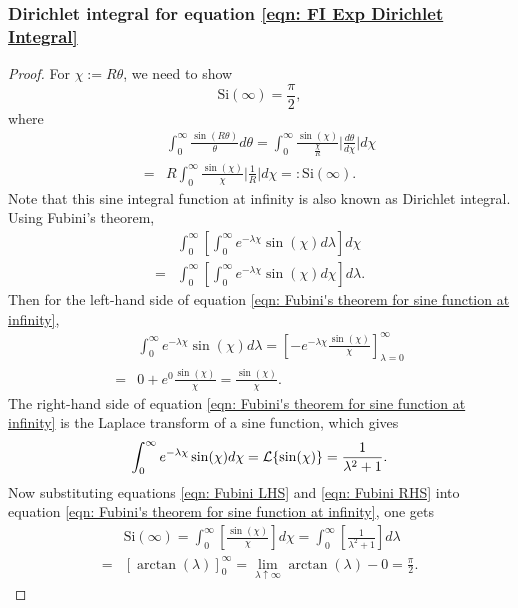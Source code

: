 \documentclass[%
 reprint,
 amsmath,amssymb,
 aps,
]{revtex4-2}
\begin{document}
\subsubsection{Dirichlet integral for equation \eqref{eqn: FI Exp Dirichlet Integral}}
\begin{proof}
    For $\chi := R\theta$, we need to show
    \begin{equation*}
        \text{Si}(\infty) = \frac{\pi}{2},
    \end{equation*}
    where
    \begin{align*}
        & \int_0^\infty \frac{\sin(R\theta)}{\theta} d\theta
        = \int_0^\infty \frac{\sin(\chi)}{\frac{\chi}{R}} \bigg|\frac{d\theta}{d\chi}\bigg| d\chi \\
        = & R \int_0^\infty \frac{\sin(\chi)}{\chi} \bigg|\frac{1}{R}\bigg| d\chi
        =: \text{Si}(\infty).
    \end{align*}
    Note that this sine integral function at infinity is also known as Dirichlet integral.
    Using Fubini's theorem,
    \begin{align} \label{eqn: Fubini's theorem for sine function at infinity}
        & \int_0^\infty\left[\int_0^\infty e^{-\lambda\chi}\sin(\chi)d\lambda\right]d\chi \\
        = & \int_0^\infty\left[\int_0^\infty e^{-\lambda\chi}\sin(\chi)d\chi\right]d\lambda.
    \end{align}
    Then for the left-hand side of equation \eqref{eqn: Fubini's theorem for sine function at infinity},
    \begin{align} \label{eqn: Fubini LHS}
        & \int_0^\infty e^{-\lambda\chi}\sin(\chi)d\lambda = \left[-e^{-\lambda\chi}\frac{\sin(\chi)}{\chi} \right]_{\lambda = 0}^\infty \\
        = & 0 + e^0\frac{\sin(\chi)}{\chi} = \frac{\sin(\chi)}{\chi}.
    \end{align}
    The right-hand side of equation \eqref{eqn: Fubini's theorem for sine function at infinity} is the Laplace transform of a sine function, which gives
    \begin{equation} \label{eqn: Fubini RHS}
        \int_0^\infty e^{-\lambda\chi}\sin(\chi)d\chi \\
        = \mathcal{L}\{\sin(\chi)\} = \frac{1}{\lambda^2 + 1}.
    \end{equation}
    Now substituting equations \eqref{eqn: Fubini LHS} and \eqref{eqn: Fubini RHS} into equation \eqref{eqn: Fubini's theorem for sine function at infinity}, one gets
    \begin{align*}
        & \text{Si}(\infty) = \int_0^\infty\left[\frac{\sin(\chi)}{\chi}\right]d\chi = \int_0^\infty\left[\frac{1}{\lambda^2 + 1}\right]d\lambda \\
        = & [\arctan(\lambda)]_0^\infty
        = \lim_{\lambda \uparrow \infty}\arctan(\lambda) - 0 = \frac{\pi}{2}.
    \end{align*}
\end{proof}
\end{document}
